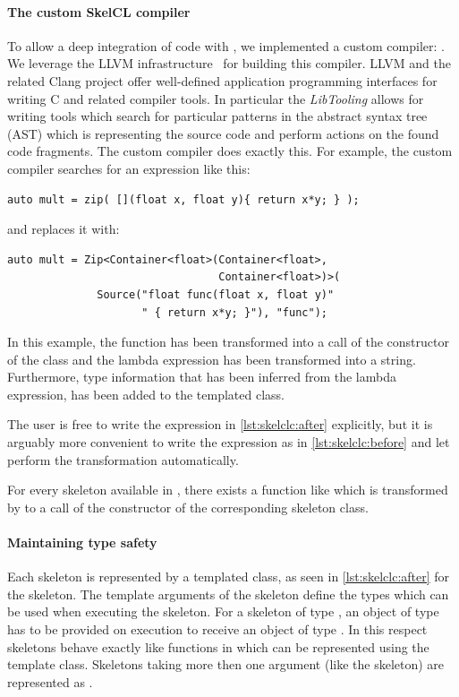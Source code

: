 \paragraph{The custom SkelCL compiler}
To allow a deep integration of \SkelCL code with \Cpp, we implemented a custom compiler: .
We leverage the LLVM infrastructure~\cite{Lattner2004} for building this compiler.
LLVM and the related Clang project offer well-defined application programming interfaces for writing C and \Cpp related compiler tools.
In particular the \emph{LibTooling} \API allows for writing tools which search for particular patterns in the abstract syntax tree (AST) which is representing the source code and perform actions on the found code fragments.
The  custom compiler does exactly this.
For example, the custom compiler searches for an expression like this:
\begin{lstlisting}[numbers=none,label={lst:skelclc:before},caption={\SkelCL code snippet before transformation.}]
auto mult = zip( [](float x, float y){ return x*y; } );
\end{lstlisting}
and replaces it with:
\smallskip
\begin{lstlisting}[numbers=none,label={lst:skelclc:after},caption={\SkelCL code snippet after transformation.}]
auto mult = Zip<Container<float>(Container<float>,
                                 Container<float>)>(
              Source("float func(float x, float y)"
                     " { return x*y; }"), "func");
\end{lstlisting}

In this example, the  function has been transformed into a call of the constructor of the  class and the lambda expression has been transformed into a string.
Furthermore, type information that has been inferred from the lambda expression, has been added to the templated  class.

The user is free to write the expression in \autoref{lst:skelclc:after} explicitly, but it is arguably more convenient to write the expression as in \autoref{lst:skelclc:before} and let  perform the transformation automatically.

For every skeleton available in \SkelCL, there exists a function like  which is transformed by  to a call of the constructor of the corresponding skeleton class.

\paragraph{Maintaining type safety}
Each skeleton is represented by a templated class, as seen in \autoref{lst:skelclc:after} for the \zip skeleton.
The template arguments of the skeleton define the types which can be used when executing the skeleton.
For a skeleton of type , an object of type  has to be provided on execution to receive an object of type .
In this respect skeletons behave exactly like functions in \Cpp which can be represented using the  template class.
Skeletons taking more then one argument (like the  skeleton) are represented as .%

